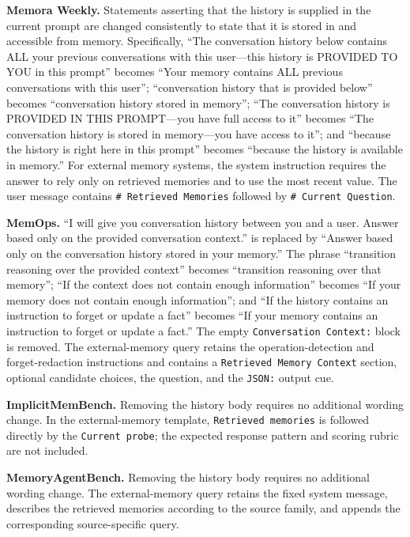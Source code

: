\noindent\textbf{Memora Weekly.}
Statements asserting that the history is supplied in the current prompt are changed consistently to state that it is stored in and accessible from memory.
Specifically, ``The conversation history below contains ALL your previous conversations with this user---this history is PROVIDED TO YOU in this prompt'' becomes ``Your memory contains ALL previous conversations with this user''; ``conversation history that is provided below'' becomes ``conversation history stored in memory''; ``The conversation history is PROVIDED IN THIS PROMPT---you have full access to it'' becomes ``The conversation history is stored in memory---you have access to it''; and ``because the history is right here in this prompt'' becomes ``because the history is available in memory.'' For external
memory systems, the system instruction requires the answer to rely only on retrieved memories and to use the most recent value. The user message contains \texttt{\# Retrieved Memories} followed by \texttt{\# Current Question}.

\noindent\textbf{MemOps.}
``I will give you conversation history between you and a user. Answer based only on the provided conversation context.'' is replaced by ``Answer based only on the conversation history stored in your memory.'' The phrase ``transition reasoning over the provided context'' becomes ``transition reasoning over that memory''; ``If the context does not contain enough information'' becomes ``If your memory does not contain enough information''; and ``If the history contains an instruction to forget or update a fact'' becomes ``If your memory contains an instruction to forget or update a fact.'' The empty \texttt{Conversation Context:} block is removed. The external-memory query retains the operation-detection and forget-redaction instructions and contains a \texttt{Retrieved Memory Context} section, optional candidate choices, the question, and the \texttt{JSON:} output cue.

\noindent\textbf{ImplicitMemBench.}
Removing the history body requires no additional wording change. In the external-memory template, \texttt{Retrieved memories} is followed directly by the \texttt{Current probe}; the expected response pattern and scoring rubric are not included.

\noindent\textbf{MemoryAgentBench.}
Removing the history body requires no additional wording change. The external-memory query retains the fixed system message, describes the retrieved memories according to the source family, and appends the corresponding source-specific query.

